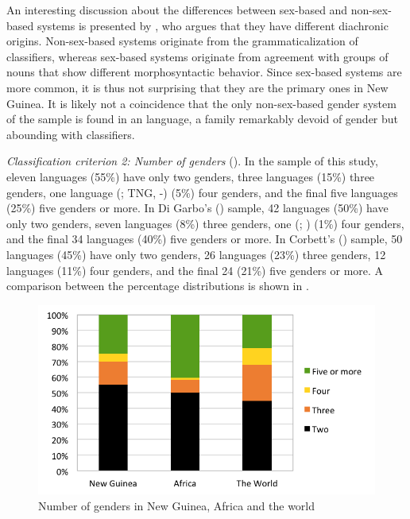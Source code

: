 \documentclass[output=collectionpaper]{langsci/langscibook}
\begin{document}
An interesting discussion about the differences between sex-based and non-sex-based systems is presented by \citet{Luraghi2011}, who argues that they have different diachronic origins. Non-sex-based systems originate from the grammaticalization of classifiers, whereas sex-based systems originate from agreement with groups of nouns that show different morphosyntactic behavior. Since sex-based systems are more common, it is thus not surprising that they are the primary ones in New Guinea. It is likely not a coincidence that the only non-sex-based gender system of the sample is found in an  language, a family remarkably devoid of gender but abounding with classifiers.


\textit{Classification criterion 2: Number of genders} ().
In the sample of this study, eleven languages (55\%) have only two genders, three languages (15\%) three genders, one language (; TNG, -) (5\%) four genders, and the final five languages (25\%) five genders or more. In Di Garbo's (\citeyear[65]{DiGarbo2014}) sample, 42 languages (50\%) have only two genders, seven languages (8\%) three genders, one (; ) (1\%) four genders, and the final 34 languages (40\%) five genders or more. In Corbett's (\citeyear{Corbett2013}) sample, 50 languages (45\%) have only two genders, 26 languages (23\%) three genders, 12 languages (11\%) four genders, and the final 24 (21\%) five genders or more. A comparison between the percentage distributions is shown in .


\begin{figure}
\includegraphics[width=.8\textwidth]{figures/09/fig8.png}
\caption{Number of genders in New Guinea, Africa and the world}
\label{fig:Svard:8}

\end{figure}
\end{document}
